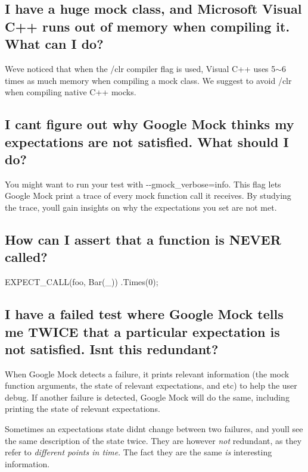 \subsection*{I have a huge mock class, and Microsoft Visual C++ runs out of memory when compiling it. What can I do?}

We\textquotesingle{}ve noticed that when the {\ttfamily /clr} compiler flag is used, Visual C++ uses 5$\sim$6 times as much memory when compiling a mock class. We suggest to avoid {\ttfamily /clr} when compiling native C++ mocks.

\subsection*{I can\textquotesingle{}t figure out why Google Mock thinks my expectations are not satisfied. What should I do?}

You might want to run your test with {\ttfamily -\/-\/gmock\+\_\+verbose=info}. This flag lets Google Mock print a trace of every mock function call it receives. By studying the trace, you\textquotesingle{}ll gain insights on why the expectations you set are not met.

\subsection*{How can I assert that a function is N\+E\+V\+ER called?}


\begin{DoxyCode}
EXPECT\_CALL(foo, Bar(\_))
    .Times(0);
\end{DoxyCode}


\subsection*{I have a failed test where Google Mock tells me T\+W\+I\+CE that a particular expectation is not satisfied. Isn\textquotesingle{}t this redundant?}

When Google Mock detects a failure, it prints relevant information (the mock function arguments, the state of relevant expectations, and etc) to help the user debug. If another failure is detected, Google Mock will do the same, including printing the state of relevant expectations.

Sometimes an expectation\textquotesingle{}s state didn\textquotesingle{}t change between two failures, and you\textquotesingle{}ll see the same description of the state twice. They are however {\itshape not} redundant, as they refer to {\itshape different points in time}. The fact they are the same {\itshape is} interesting information.

